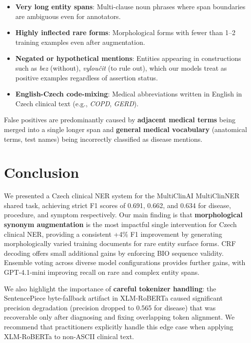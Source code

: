 \documentclass[11pt]{article}
\begin{document}
\begin{itemize}
  \item \textbf{Very long entity spans}: Multi-clause noun phrases where span boundaries
        are ambiguous even for annotators.
  \item \textbf{Highly inflected rare forms}: Morphological forms with fewer than 1--2
        training examples even after augmentation.
  \item \textbf{Negated or hypothetical mentions}: Entities appearing in constructions
        such as \textit{bez} (without), \textit{vyloučit} (to rule out), which our
        models treat as positive examples regardless of assertion status.
  \item \textbf{English-Czech code-mixing}: Medical abbreviations written in English
        in Czech clinical text (e.g., \textit{COPD}, \textit{GERD}).
\end{itemize}

False positives are predominantly caused by \textbf{adjacent medical terms} being merged
into a single longer span and \textbf{general medical vocabulary} (anatomical terms, test
names) being incorrectly classified as disease mentions.

\section{Conclusion}

We presented a Czech clinical NER system for the MultiClinAI MultiClinNER shared task,
achieving strict F1 scores of 0.691, 0.662, and 0.634 for disease, procedure, and
symptom respectively. Our main finding is that \textbf{morphological synonym augmentation}
is the most impactful single intervention for Czech clinical NER, providing a consistent
+4\% F1 improvement by generating morphologically varied training documents for rare
entity surface forms. CRF decoding offers small additional gains by enforcing BIO
sequence validity. Ensemble voting across diverse model configurations provides further
gains, with GPT-4.1-mini improving recall on rare and complex entity spans.

We also highlight the importance of \textbf{careful tokenizer handling}: the SentencePiece
byte-fallback artifact in XLM-RoBERTa caused significant precision degradation (precision
dropped to 0.565 for disease) that was recoverable only after diagnosing and fixing
overlapping token alignment. We recommend that practitioners explicitly handle this edge
case when applying XLM-RoBERTa to non-ASCII clinical text.
\end{document}
